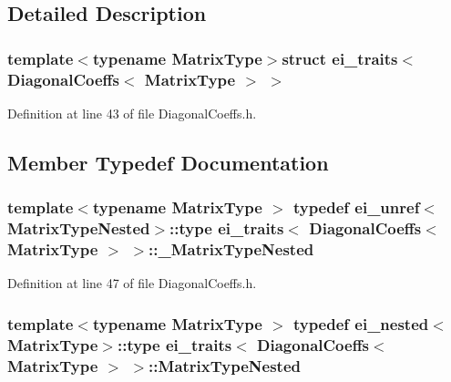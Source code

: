 \subsection{Detailed Description}
\subsubsection*{template$<$typename Matrix\-Type$>$struct ei\-\_\-traits$<$ Diagonal\-Coeffs$<$ Matrix\-Type $>$ $>$}



Definition at line 43 of file Diagonal\-Coeffs.\-h.



\subsection{Member Typedef Documentation}
\hypertarget{structei__traits_3_01_diagonal_coeffs_3_01_matrix_type_01_4_01_4_a41ed5ebc8553c1d43a2987f9fc88c6f5}{
\subsubsection[{\-\_\-\-Matrix\-Type\-Nested}]{\setlength{\rightskip}{0pt plus 5cm}template$<$typename Matrix\-Type $>$ typedef {\bf ei\-\_\-unref}$<${\bf Matrix\-Type\-Nested}$>$\-::{\bf type} {\bf ei\-\_\-traits}$<$ {\bf Diagonal\-Coeffs}$<$ Matrix\-Type $>$ $>$\-::{\bf \-\_\-\-Matrix\-Type\-Nested}}}\label{structei__traits_3_01_diagonal_coeffs_3_01_matrix_type_01_4_01_4_a41ed5ebc8553c1d43a2987f9fc88c6f5}


Definition at line 47 of file Diagonal\-Coeffs.\-h.

\hypertarget{structei__traits_3_01_diagonal_coeffs_3_01_matrix_type_01_4_01_4_a1caefbc9d10fd616affe57425413ac73}{
\subsubsection[{Matrix\-Type\-Nested}]{\setlength{\rightskip}{0pt plus 5cm}template$<$typename Matrix\-Type $>$ typedef {\bf ei\-\_\-nested}$<$Matrix\-Type$>$\-::{\bf type} {\bf ei\-\_\-traits}$<$ {\bf Diagonal\-Coeffs}$<$ Matrix\-Type $>$ $>$\-::{\bf Matrix\-Type\-Nested}}}\label{structei__traits_3_01_diagonal_coeffs_3_01_matrix_type_01_4_01_4_a1caefbc9d10fd616affe57425413ac73}


